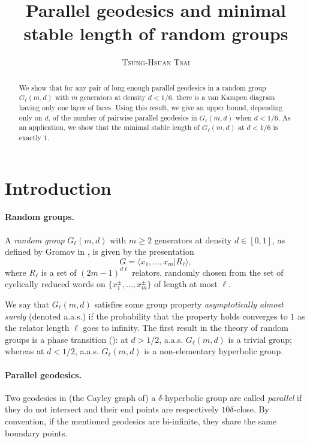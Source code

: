 \documentclass[a4paper]{article}
\title{Parallel geodesics and minimal stable length of random groups}
\author{\textsc{Tsung-Hsuan Tsai}}
\affil{Institut Camille Jordan, Université Lyon 1\\
\small{tsai@math.univ-lyon1.fr}}
\date{}
\newcommand\Pres[2]{\langle #1 | #2 \rangle}
\theoremstyle{remark}
\begin{document}
\maketitle

\begin{abstract}
We show that for any pair of long enough parallel geodesics in a random group $G_\ell(m,d)$ with $m$ generators at density $d<1/6$, there is a van Kampen diagram having only one layer of faces. Using this result, we give an upper bound, depending only on $d$, of the number of pairwise parallel geodesics in $G_\ell(m,d)$ when $d<1/6$. As an application, we show that the minimal stable length of $G_\ell(m,d)$ at $d<1/6$ is exactly $1$.
\end{abstract}
\tableofcontents

\newpage

\section{Introduction}

\paragraph{Random groups.} A \textit{random group} $G_\ell(m,d)$ with $m\geq 2$ generators at density $d\in[0,1]$, as defined by Gromov in \cite{Gro93}, is given by the presentation \[G = \Pres{x_1,\dots,x_m}{R_\ell},\] where $R_\ell$ is a set of $(2m-1)^{d\ell}$ relators, randomly chosen from the set of cyclically reduced words on $\{x_1^\pm,\dots,x_m^\pm\}$ of length at most $\ell$.

We say that $G_\ell(m,d)$ satisfies some group property \textit{asymptotically almost surely} (denoted a.a.s.) if the probability that the property holds converges to $1$ as the relator length $\ell$ goes to infinity. The first result in the theory of random groups is a phase transition (\cite{Gro93}): at $d>1/2$, a.a.s. $G_\ell(m,d)$ is a trivial group; whereas at $d<1/2$, a.a.s. $G_\ell(m,d)$ is a non-elementary hyperbolic group.

\paragraph{Parallel geodesics.} Two geodesics in (the Cayley graph of) a $\delta$-hyperbolic group are called \textit{parallel} if they do not intersect and their end points are respectively $10\delta$-close. By convention, if the mentioned geodesics are bi-infinite, they share the same boundary points.
\end{document}
